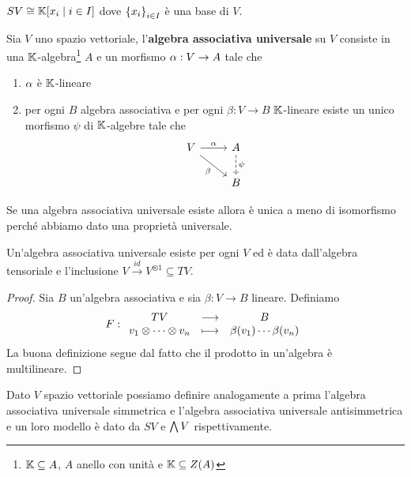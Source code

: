 \begin{remark}
$SV\cong \mathbb{K}[x_i\mid i\in I]$ dove $\left\{{x_i}\right\}_{i\in I}$ \`e una base di $V$.
\end{remark}


\begin{definition}
Sia $V$ uno spazio vettoriale, l'\textbf{algebra associativa universale} su $V$ consiste in una $\mathbb{K}$-algebra\footnote{$\mathbb{K}\subseteq A$, $A$ anello con unit\`a e $\mathbb{K}\subseteq Z(A)$} $A$ e un morfismo $\alpha:V\to A$ tale che
\begin{enumerate}
    \item $\alpha$ \`e $\mathbb{K}$-lineare
    \item per ogni $B$ algebra associativa e per ogni $\beta:V\to B$ $\mathbb{K}$-lineare esiste un unico morfismo $\psi$ di $\mathbb{K}$-algebre tale che
\[\begin{tikzcd}
	V & A \\
	& B
	\arrow["\al", from=1-1, to=1-2]
	\arrow["\beta"', from=1-1, to=2-2]
	\arrow["\psi", dashed, from=1-2, to=2-2]
\end{tikzcd}\]
\end{enumerate}
\end{definition}
\begin{remark}
Se una algebra associativa universale esiste allora \`e unica a meno di isomorfismo perch\'e abbiamo dato una propriet\`a universale.
\end{remark}

\begin{proposition}
Un'algebra associativa universale esiste per ogni $V$ ed \`e data dall'algebra tensoriale e l'inclusione $V\overset{id}{\to} V^{\otimes 1}\subseteq TV$.
\end{proposition}
\begin{proof}
Sia $B$ un'algebra associativa e sia $\beta:V\to B$ lineare. Definiamo
\[F:\begin{array}{ccc} {TV} & \longrightarrow & {B}\\ {v_1\otimes\cdots\otimes v_n} & \longmapsto & {\beta(v_1)\cdots \beta(v_n)} \end{array}\]
La buona definizione segue dal fatto che il prodotto in un'algebra \`e multilineare.
\end{proof}

\begin{remark}
Dato $V$ spazio vettoriale possiamo definire analogamente a prima l'algebra associativa universale simmetrica e l'algebra associativa universale antisimmetrica e un loro modello \`e dato da $SV$ e $\bigwedge V$ rispettivamente.
\end{remark}













